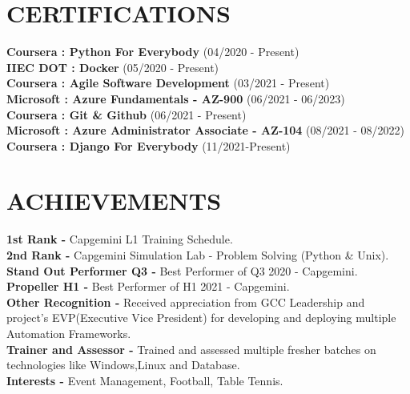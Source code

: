 \documentclass[letterpaper,11pt]{article}
\begin{document}
\section{CERTIFICATIONS}
 \begin{itemize}[leftmargin=0in, label={}]
    \small{\item{
    \textbf{Coursera : Python For Everybody} {(04/2020 - Present)}\vspace{2pt} \\
    \textbf{IIEC DOT : Docker} {(05/2020 - Present)}\vspace{2pt} \\
    \textbf{Coursera : Agile Software Development} {(03/2021 - Present)}\vspace{2pt} \\
    \textbf{Microsoft : Azure Fundamentals - AZ-900} {(06/2021 - 06/2023)}\vspace{2pt} \\
    \textbf{Coursera : Git \& Github} {(06/2021 - Present)}\vspace{2pt} \\
    \textbf{Microsoft : Azure Administrator Associate - AZ-104} {(08/2021 - 08/2022)}\vspace{2pt} \\
    \textbf{Coursera : Django For Everybody} {(11/2021-Present)}\vspace{2pt} \\
    }
    }
 \end{itemize}
 
\section{ACHIEVEMENTS}
 \begin{itemize}[leftmargin=0in, label={}]
    \small{\item{
    \textbf{1st Rank -} {Capgemini L1 Training Schedule.} \vspace{2pt} \\
    \textbf{2nd Rank -} {Capgemini Simulation Lab - Problem Solving (Python \& Unix).} \vspace{2pt} \\
    \textbf{Stand Out Performer Q3 -} {Best Performer of Q3 2020 - Capgemini.} \vspace{2pt} \\
    \textbf{Propeller H1 -} {Best Performer of H1 2021 - Capgemini.} \vspace{2pt} \\
    \textbf{Other Recognition -} {Received appreciation from GCC Leadership and project's EVP(Executive Vice President) for developing and deploying multiple Automation Frameworks.} \vspace{2pt} \\
    \textbf{Trainer and Assessor -} {Trained and assessed multiple fresher batches on technologies like Windows,Linux and Database.} \vspace{2pt} \\
    \textbf{Interests -} {Event Management, Football, Table Tennis.} \vspace{2pt} \\
    }
    }
 \end{itemize}
\end{document}

